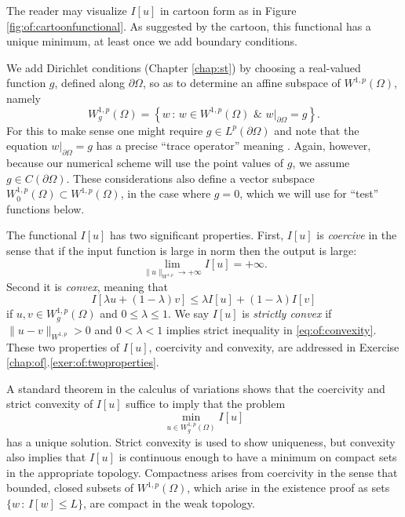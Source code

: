 The reader may visualize $I[u]$ in cartoon form as in Figure \ref{fig:of:cartoonfunctional}.  As suggested by the cartoon, this functional has a unique minimum, at least once we add boundary conditions.

We add Dirichlet conditions (Chapter \ref{chap:st}) by choosing a real-valued function $g$, defined along $\partial \Omega$, so as to determine an affine subspace of $W^{1,p}(\Omega)$, namely
\begin{equation}
    W_g^{1,p}(\Omega) = \left\{w \,:\, w \in W^{1,p}(\Omega) \,\, \& \,\, w\big|_{\partial \Omega} = g\right\}.  \label{eq:of:affinedirichlet}
\end{equation}
For this to make sense one might require $g \in L^p(\partial \Omega)$ and note that the equation $w\big|_{\partial \Omega} = g$ has a precise ``trace operator'' meaning \citep[section 5.5]{Evans2010}.  Again, however, because our numerical scheme will use the point values of $g$, we assume $g\in C(\partial\Omega)$.  These considerations also define a vector subspace $W_0^{1,p}(\Omega) \subset W^{1,p}(\Omega)$, in the case where $g=0$, which we will use for ``test'' functions below.

The functional $I[u]$ has two significant properties.  First, $I[u]$ is \emph{coercive} in the sense that if the input function is large in norm then the output is large:
\begin{equation}
\lim_{\|u\|_{W^{1,p}} \to +\infty} I[u] = +\infty.   \label{eq:of:coercivity}
\end{equation}
Second it is \emph{convex}, meaning that
\begin{equation}
I[\lambda u + (1-\lambda) v] \le \lambda I[u] + (1-\lambda) I[v]    \label{eq:of:convexity}
\end{equation}
if $u,v\in W_g^{1,p}(\Omega)$ and $0 \le \lambda \le 1$.  We say $I[u]$ is \emph{strictly convex} if $\|u-v\|_{W^{1,p}} > 0$ and $0 < \lambda < 1$ implies strict inequality in \eqref{eq:of:convexity}.  These two properties of $I[u]$, coercivity and convexity, are addressed in Exercise \ref{chap:of}.\ref{exer:of:twoproperties}.

A standard theorem in the calculus of variations \citep[Theorem 8.2.2]{Evans2010} shows that the coercivity and strict convexity of $I[u]$ suffice to imply that the problem
\begin{equation}
\min_{u \in W_g^{1,p}(\Omega)} I[u] \label{eq:of:plapmin}
\end{equation}
has a unique solution.  Strict convexity is used to show uniqueness, but convexity also implies that $I[u]$ is continuous enough to have a minimum on compact sets in the appropriate topology.  Compactness arises from coercivity in the sense that bounded, closed subsets of $W^{1,p}(\Omega)$, which arise in the existence proof as sets $\{w\,:\,I[w] \le L\}$, are compact in the weak topology.

